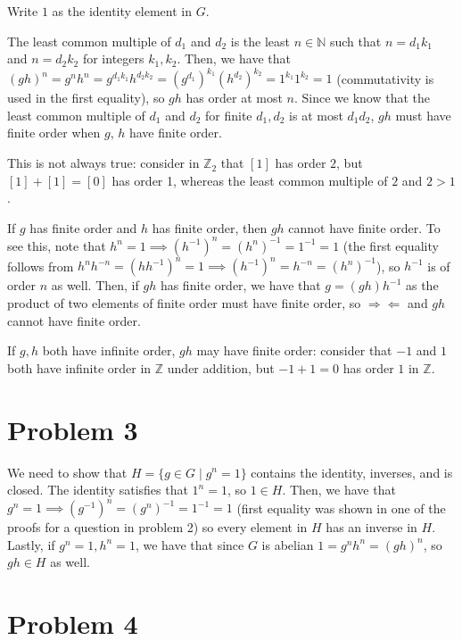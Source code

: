 \documentclass[12pt,letterpaper]{article}
\theoremstyle{definition}
\newcommand{\contra}{\Rightarrow\!\Leftarrow}
\newcommand{\Z}{\mathbb{Z}}
\newcommand{\N}{\mathbb{N}}
\begin{document}
Write \(1\) as the identity element in $G$.

The least common multiple of \(d_{1}\) and \(d_{2}\) is the least \(n \in \N\) such that \(n = d_{1}k_{1}\) and \(n = d_{2}k_{2}\) for integers \(k_{1}, k_{2}\). Then, we have that \((gh)^{n} = g^{n}h^{n} = g^{d_{1}k_{1}}h^{d_{2}k_{2}} = (g^{d_{1}})^{k_{1}}(h^{d_{2}})^{k_{2}} = 1^{k_{1}}1^{k_{2}} = 1\) (commutativity is used in the first equality), so \(gh\) has order at most \(n\). Since we know that the least common multiple of \(d_{1}\) and \(d_{2}\) for finite \(d_{1}, d_{2}\) is at most \(d_{1}d_{2}\), \(gh\) must have finite order when \(g\), \(h\) have finite order.

This is not always true: consider in \(\Z_{2}\) that \([1]\) has order \(2\), but \([1] + [1] = [0]\) has order 1, whereas the least common multiple of \(2\) and \(2 > 1\).

If $g$ has finite order and $h$ has finite order, then $gh$ cannot have finite order. To see this, note that $h^{n} = 1 \implies (h^{-1})^{n} = (h^{n})^{-1} = 1^{-1} = 1$ (the first equality follows from $h^{n}h^{-n} = (hh^{-1})^{n} = 1 \implies (h^{-1})^{n} =  h^{-n} = (h^{n})^{-1}$), so $h^{-1}$ is of order $n$ as well. Then, if $gh$ has finite order, we have that $g = (gh)h^{-1}$ as the product of two elements of finite order must have finite order, so $\contra$ and $gh$ cannot have finite order.

If $g, h$ both have infinite order, $gh$ may have finite order: consider that $-1$ and $1$ both have infinite order in $\Z$ under addition, but $-1 + 1 = 0$ has order $1$ in $\Z$.

\section*{Problem 3}

We need to show that $H = \{g \in G \mid g^{n} = 1\}$ contains the identity, inverses, and is closed. The identity satisfies that $1^{n} = 1$, so $1 \in H$. Then, we have that $g^{n} = 1 \implies (g^{-1})^{n} = (g^{n})^{-1} = 1^{-1} = 1$ (first equality was shown in one of the proofs for a question in problem 2) so every element in $H$ has an inverse in $H$. Lastly, if $g^{n} = 1, h^{n} = 1$, we have that since $G$ is abelian $1 = g^{n}h^{n} = (gh)^{n}$, so $gh \in H$ as well.

\section*{Problem 4}
\end{document}
